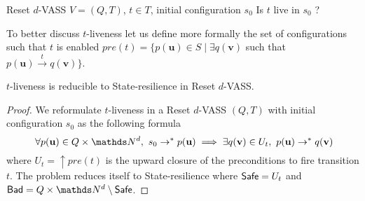 {Reset $d$-VASS $V=(Q,T)$, $t \in T$, initial configuration $s_0$}
{Is $t$ live in $s_0$ ? \\}


To better discuss $t$-liveness let us define more formally the set of configurations such that $t$ is enabled
$pre(t)=\{ p(\textbf{u}) \in S \mid \exists q(\textbf{v})$ such that $ p(\textbf{u}) \xrightarrow{t} q(\textbf{v}) \}$.

\iffalse
\alain{ou alors $t=(u,u')$ such that $u \rightarrow u'$ mais alors c'est bizarre de nommer par la même lettre $t$ des couples différents $(u,u'), (v,v'),...$ dans un WSTS...ou alors on appelle transition un couple $(u,u')$ such that $u \rightarrow u'$ mais plus de lettre $t$...ou on définit un WSTS par un nombre fini de (shéma de ) transition $t_i$ qui sont compatibles par compatibilité mais ça contraint à un nombre fini (comme dans les VASS) ou alors on ne parle ici que des VASS et pas des WSTS mais ça suffira puisque state resilience pour VASS implique pour WSTS BREF il faut réfléchir à ce qu'est une transition...}

\mathieu{En train de penser que le mieux serait de définir la $t$-liveness pas pour les WSTS mais pour les (Reset) VASS uniquement et ensuite dire SRP indécidable dans WSTS car indécidable pour les Reset VASS.}

\fi


\begin{proposition}\label{reductions}
{\sc $t$-liveness} is reducible to {\sc State-resilience} in Reset $d$-VASS.
\end{proposition}


\begin{proof}
We reformulate $t$-liveness 
in a 
Reset $d$-VASS $(Q,T)$ 
with initial configuration $s_0$
as the following formula
\[ ~ \forall p(\textbf{u}) \in Q \times \N^d, 
~ s_0 \rightarrow^* p(\textbf{u}) \implies \exists q(\textbf{v}) \in U_t, ~ p(\textbf{u}) \rightarrow^{*} q(\textbf{v})\]
where
$U_t=\uparrow pre(t)$ 
is the upward closure of the preconditions to fire transition $t$.  
The problem reduces itself to {\sc State-resilience}
where $\textsf{Safe} = U_t$ and $\Bad = Q \times \N^d \setminus \Safe$.
\end{proof}

